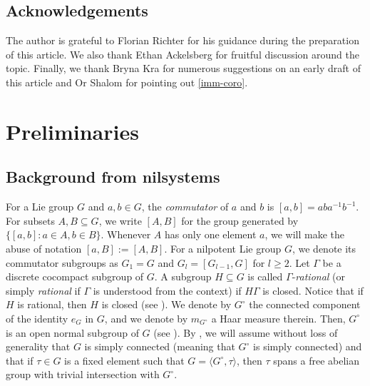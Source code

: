 \documentclass[letter, 11pt]{article}
\theoremstyle{definition}
\theoremstyle{plain}
\newcommand{\1}{\mathbbm{1}}
\begin{document}
\subsection*{Acknowledgements}
The author is grateful to Florian Richter for his guidance during the preparation of this article. We also thank Ethan Ackelsberg for fruitful discussion around the topic. Finally, we thank Bryna Kra for numerous suggestions on an early draft of this article and Or Shalom for pointing out \cref{imm-coro}.


\section{Preliminaries}
\subsection{Background from nilsystems}\label{section-2.1}
For a Lie group $G$ and $a,b\in G$, the \textit{commutator} of $a$ and $b$ is $[a,b]=aba^{-1}b^{-1}$. For subsets $A,B\subseteq G$, we write $[A,B]$ for the group generated by $\{[a,b]: a\in A, b\in B\}$. Whenever $A$ has only one element $a$, we will make the abuse of notation $[a,B]:=[A,B]$. For a nilpotent Lie group $G$, we denote its commutator subgroups as $G_1=G$ and $G_l=\left[G_{l-1}, G\right]$ for $l \geq 2$. Let $\Gamma$ be a discrete cocompact subgroup of $G$. A subgroup $H\subseteq G$ is called $\Gamma$-\textit{rational} (or simply \textit{rational} if $\Gamma$ is understood from the context) if $H\Gamma$ is closed. Notice that if $H$ is rational, then $H$ is closed (see \cite[Lemma 14 Chapter 10]{Host_Kra_nilpotent_structures_ergodic_theory:2018}). We denote by $G^{\circ}$ the connected component of the identity $e_G$ in $G$, and we denote by $m_{G^{\circ}}$ a Haar measure therein. Then, $G^{\circ}$ is an open normal subgroup of $G$ (see \cite[Section 4.1]{Host_Kra_Maass_variations_top_recurrence:2016}). By \cite[Chapter 10, Lemma 7 and Theorem 13]{Host_Kra_nilpotent_structures_ergodic_theory:2018}, we will assume without loss of generality that $G$ is simply connected (meaning that $G^{\circ}$ is simply connected) and that if $\tau\in G$ is a fixed element such that $G=\langle G^\circ,\tau\rangle$, then $\tau$ spans a free abelian group with trivial intersection with $G^\circ$.
\end{document}
